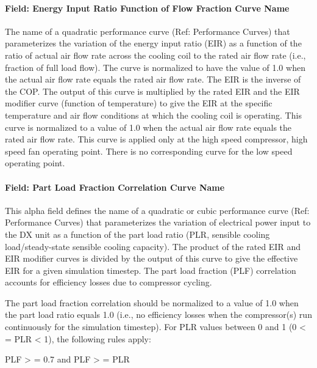 \paragraph{Field: Energy Input Ratio Function of Flow Fraction Curve Name}\label{field-energy-input-ratio-function-of-flow-fraction-curve-name-1}

The name of a quadratic performance curve (Ref: Performance Curves) that parameterizes the variation of the energy input ratio (EIR) as a function of the ratio of actual air flow rate across the cooling coil to the rated air flow rate (i.e., fraction of full load flow). The curve is normalized to have the value of 1.0 when the actual air flow rate equals the rated air flow rate. The EIR is the inverse of the COP. The output of this curve is multiplied by the rated EIR and the EIR modifier curve (function of temperature) to give the EIR at the specific temperature and air flow conditions at which the cooling coil is operating. This curve is normalized to a value of 1.0 when the actual air flow rate equals the rated air flow rate. This curve is applied only at the high speed compressor, high speed fan operating point. There is no corresponding curve for the low speed operating point.

\paragraph{Field: Part Load Fraction Correlation Curve Name}\label{field-part-load-fraction-correlation-curve-name-3}

This alpha field defines the name of a quadratic or cubic performance curve (Ref: Performance Curves) that parameterizes the variation of electrical power input to the DX unit as a function of the part load ratio (PLR, sensible cooling load/steady-state sensible cooling capacity). The product of the rated EIR and EIR modifier curves is divided by the output of this curve to give the effective EIR for a given simulation timestep. The part load fraction (PLF) correlation accounts for efficiency losses due to compressor cycling.

The part load fraction correlation should be normalized to a value of 1.0 when the part load ratio equals 1.0 (i.e., no efficiency losses when the compressor(s) run continuously for the simulation timestep). For PLR values between 0 and 1 (0 \textless{} = PLR \textless{} 1), the following rules apply:

PLF \textgreater{} = 0.7 and PLF \textgreater{} = PLR

